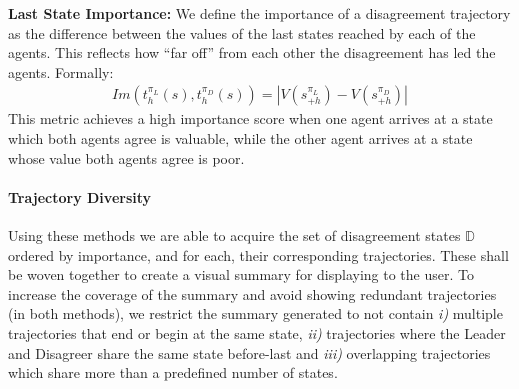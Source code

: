 \textbf{Last State Importance:}
We define the importance of a disagreement
trajectory as the difference between the values of the last states reached by
each of the agents. This reflects how ``far off'' from each other the
disagreement has led the agents. Formally:
\begin{align}
    Im({t}_{h}^{\pi_{L}}(s),{t}_{h}^{\pi_{D}}(s)) = 
    |V(s^{\pi_L}_{+h}) - V(s^{\pi_D}_{+h})|
\end{align}
This metric achieves a high importance score when one agent arrives at a state
which both agents agree is valuable, while the other agent arrives at a state whose value both agents agree is poor.


\paragraph{Trajectory Diversity}
Using these methods we are able to acquire the set of disagreement states
$\mathbb{D}$ ordered by importance, and for each, their corresponding
trajectories. These shall be woven together to create a visual summary for
displaying to the user. To increase the coverage of the summary and avoid
showing redundant trajectories (in both methods), we restrict the summary generated to not contain
\emph{i)} multiple trajectories that end or begin at the same state, \emph{ii)}
trajectories where the Leader and Disagreer share the same state before-last
and \emph{iii)} overlapping trajectories which share more than a predefined
number of states. 


